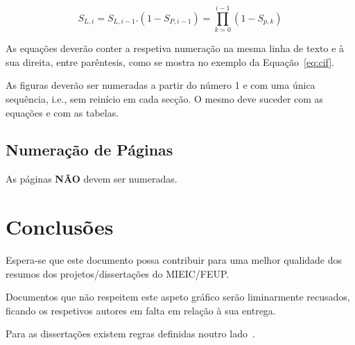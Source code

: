 \documentclass[twocolumn]{article}
\begin{document}
\begin{equation}
  S_{L,i} = S_{L,i-1} . (1-S_{P,i-1}) = \prod_{k=0}^{i-1} (1-S_{p,k}) \label{eq:cif}
\end{equation}

As equações deverão conter a respetiva numeração na mesma linha de texto e à sua direita, entre parêntesis, como se mostra no exemplo da Equação~\ref{eq:cif}.

As figuras deverão ser numeradas a partir do número 1 e com uma única sequência, i.e., sem reinício em cada secção. 
O mesmo deve suceder com as equações e com as tabelas.

\subsection{Numeração de Páginas}\label{sec:number}

As páginas \textbf{NÃO} devem ser numeradas.

\section{Conclusões}\label{sec:conclui}

Espera-se que este documento possa contribuir para uma melhor qualidade dos resumos dos projetos/dissertações do MIEIC/FEUP.

Documentos que não respeitem este aspeto gráfico serão liminarmente recusados, ficando os respetivos autores em falta em relação à sua entrega.

Para as dissertações existem regras definidas noutro lado~\cite{kn:Mat93}.


\end{document}
